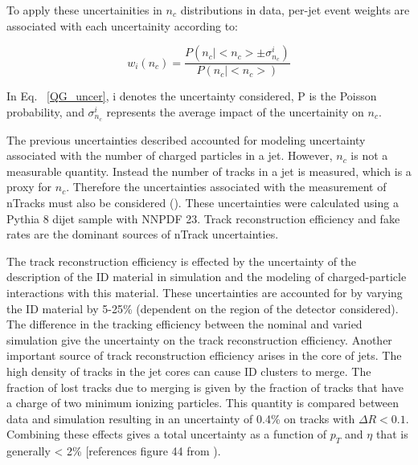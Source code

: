 To apply these uncertainities in $n_{c}$ distributions in data, per-jet event weights are associated with each uncertainity according to:

\begin{equation}
w_{i}(n_{c}) = \frac{P(n_{c}|<n_{c}> \pm \sigma^{i}_{n_{c}})} {P(n_{c}|<n_{c}>)}
\end{equation}

In Eq. ~\eqref{QG_uncer}, i denotes the uncertainty considered, P is the Poisson probability, and $\sigma^{i}_{n_{c}}$ represents the average impact of the uncertainity on $n_{c}$. 



The previous uncertainties described accounted for modeling uncertainty associated with the number of charged particles in a jet. However, $n_{c}$ is not a measurable quantity. Instead the number of tracks in a jet is measured, which is a proxy for $n_{c}$. Therefore the uncertainties associated with the measurement of nTracks must also be considered (\cite{JetFrag}). These uncertainties were calculated using a Pythia 8 dijet sample with NNPDF 23.  Track reconstruction efficiency and fake rates are the dominant sources of nTrack uncertainties. 

The track reconstruction efficiency is effected by the uncertainty of the description of the ID material in simulation and the modeling of charged-particle interactions with this material. These uncertainties are accounted for by varying the ID material by 5-25\% (dependent on the region of the detector considered). The difference in the tracking efficiency between the nominal and varied simulation give the uncertainty on the track reconstruction efficiency. Another important source of track reconstruction efficiency arises in the core of jets. The high density of tracks in the jet cores can cause ID clusters to merge. The fraction of lost tracks due to merging is given by the fraction of tracks that have a charge of two minimum ionizing particles. This quantity is compared between data and simulation resulting in an uncertainty of 0.4\% on tracks with $\Delta R < 0.1$. Combining these effects gives a total uncertainty as a function of $p_{T}$ and $\eta$ that is generally < 2\% [references figure 44 from \cite{JetFrag}). 

